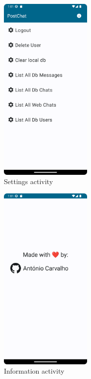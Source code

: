 \begin{figure}[!ht]
	\centering
	\includegraphics[trim={0cm -3cm 0 -3cm}, width=0.4\textwidth]{./Chapter6/Figures/SettingsActivity}
	\caption{Settings activity}
	\label{fig:SAI}
\end{figure}


\begin{figure}[!ht]
	\centering
	\includegraphics[trim={0cm -3cm 0 -3cm}, width=0.4\textwidth]{./Chapter6/Figures/InfoActivity}
	\caption{Information activity}
	\label{fig:SAI1}
\end{figure}


